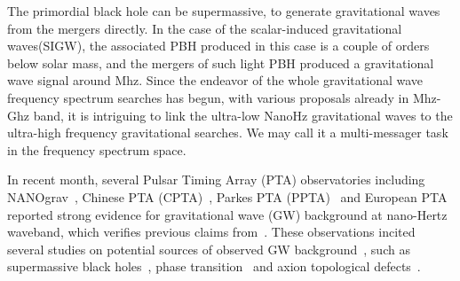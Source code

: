 \documentclass[aps, 10pt, preprintnumbers, prd, amsmath, amssymb,twocolumn, notitlepage, nofootinbib]{revtex4} %
\begin{document}
{\color{blue}
The primordial black hole can be supermassive, to generate gravitational waves from the mergers directly. 
In the case of the scalar-induced gravitational waves(SIGW), 
the associated PBH produced in this case is a couple of orders below solar mass, 
and the mergers of such light PBH produced a gravitational wave signal around Mhz. 
Since the endeavor of the whole gravitational wave frequency spectrum searches has begun, 
with various proposals already in Mhz-Ghz band\cite{Domcke:2022rgu}, 
it is intriguing to link the ultra-low NanoHz gravitational waves to the ultra-high frequency gravitational searches. 
We may call it a multi-messager task in the frequency spectrum space.
}

In recent month, 
several Pulsar Timing Array (PTA) observatories including NANOgrav~\cite{NANOGrav:2023gor}, 
Chinese PTA (CPTA)~\cite{Xu:2023wog},
Parkes PTA (PPTA)~\cite{Reardon:2023gzh}
and European PTA~\cite{EPTA:2023gyr,EPTA:2023fyk}
reported strong evidence for gravitational wave (GW) background at nano-Hertz waveband,
which verifies previous claims from~\cite{NANOGrav:2020bcs, Chen:2021rqp, Goncharov:2021oub, Antoniadis:2022pcn}.
These observations incited several studies on potential sources of observed GW background~\cite{Franciolini:2023pbf},
such as supermassive black holes~\cite{NANOGrav:2023hvm,Middleton:2020asl}, 
phase transition~\cite{Bian:2020urb,NANOGrav:2021flc,Xue:2021gyq,Wang:2022wwj} and 
axion topological defects~\cite{Wang:2022rjz,Ferreira:2022zzo,Inomata:2023drn}.


\end{document}
